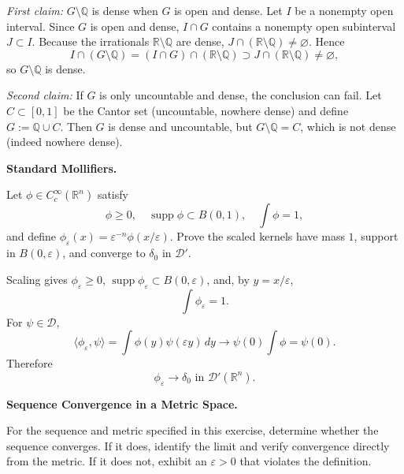 \begin{solution}
\emph{First claim:} $G\setminus\mathbb Q$ is dense when $G$ is open and dense.
	Let $I$ be a nonempty open interval. Since $G$ is open and dense, $I\cap G$ contains a nonempty
	open subinterval $J\subset I$. Because the irrationals $\mathbb R\setminus\mathbb Q$ are dense,
	$J\cap(\mathbb R\setminus\mathbb Q)\neq\varnothing$. Hence
	\[
	I\cap(G\setminus\mathbb Q)=(I\cap G)\cap(\mathbb R\setminus\mathbb Q)\supset J\cap(\mathbb R\setminus\mathbb Q)\neq\varnothing,
	\]
	so $G\setminus\mathbb Q$ is dense.

	\medskip
	\emph{Second claim:} If $G$ is only uncountable and dense, the conclusion can fail.
	Let $C\subset[0,1]$ be the Cantor set (uncountable, nowhere dense) and define $G:=\mathbb Q\cup C$.
	Then $G$ is dense and uncountable, but $G\setminus\mathbb Q=C$, which is not dense (indeed nowhere dense).
\end{solution}

\begin{problem}[CP-II-0148]
\label{prob:cp-ii-0148}
\textbf{Standard Mollifiers.}

\hspace*{1.5em}Let \(\phi\in C_c^\infty(\mathbb R^n)\) satisfy
\[
\phi\ge0,\quad \operatorname{supp}\phi\subset B(0,1),\quad \int\phi=1,
\]
and define \(\phi_\varepsilon(x)=\varepsilon^{-n}\phi(x/\varepsilon)\). Prove the scaled kernels have mass \(1\), support in \(B(0,\varepsilon)\), and converge to \(\delta_0\) in \(\mathcal D'\).
\end{problem}

\begin{solution}
Scaling gives \(\phi_\varepsilon\ge0\), \(\operatorname{supp}\phi_\varepsilon\subset B(0,\varepsilon)\), and, by \(y=x/\varepsilon\),
\[
\int\phi_\varepsilon=1.
\]
For \(\psi\in\mathcal D\),
\[
\langle\phi_\varepsilon,\psi\rangle=\int\phi(y)\psi(\varepsilon y)\,dy\to\psi(0)\int\phi=\psi(0).
\]
Therefore
\[
\boxed{\phi_\varepsilon\to\delta_0\text{ in }\mathcal D'(\mathbb R^n).}
\]
\end{solution}


\begin{problem}[CP-II-0149]
\label{prob:cp-ii-0149}
\textbf{Sequence Convergence in a Metric Space.}

\hspace*{1.5em}For the sequence and metric specified in this exercise, determine whether the
sequence converges. If it does, identify the limit and verify convergence
directly from the metric. If it does not, exhibit an \(\varepsilon>0\) that
violates the definition.
\end{problem}

